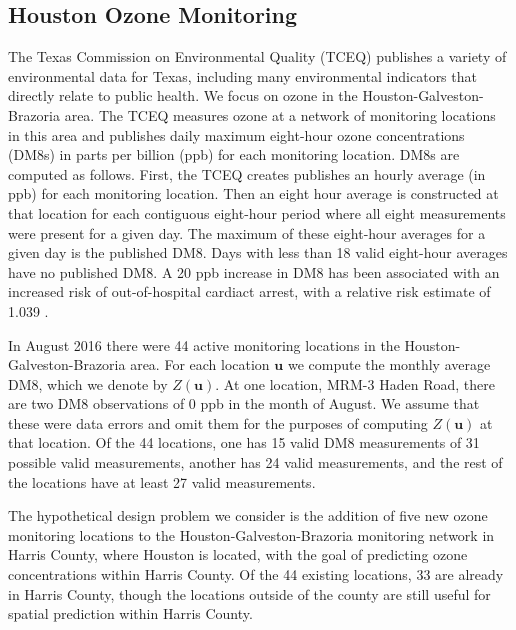 \documentclass[cmbright]{staauth}
\begin{document}
\subsection{Houston Ozone Monitoring}\label{sec:houston}
The Texas Commission on Environmental Quality (TCEQ) publishes a variety of environmental data for Texas, including many environmental indicators that directly relate to public health. We focus on ozone in the Houston-Galveston-Brazoria area. The TCEQ measures ozone at a network of monitoring locations in this area and publishes daily maximum eight-hour ozone concentrations (DM8s) in parts per billion (ppb) for each monitoring location. DM8s are computed as follows. First, the TCEQ creates publishes an hourly average (in ppb) for each monitoring location. Then an eight hour average is constructed at that location for each contiguous eight-hour period where all eight measurements were present for a given day. The maximum of these eight-hour averages for a given day is the published DM8. Days with less than 18 valid eight-hour averages have no published DM8. A 20 ppb increase in DM8 has been associated with an increased risk of out-of-hospital cardiact arrest, with a relative risk estimate of 1.039 \citep[95\% CI 1.005, 1.073]{ensor2013case}.

In August 2016 there were 44 active monitoring locations in the Houston-Galveston-Brazoria area. For each location $\bm{u}$ we compute the monthly average DM8, which we denote by $Z(\bm{u})$. At one location, MRM-3 Haden Road, there are two DM8 observations of 0 ppb in the month of August. We assume that these were data errors and omit them for the purposes of computing $Z(\bm{u})$ at that location. Of the 44 locations, one has 15 valid DM8 measurements of 31 possible valid measurements, another has 24 valid measurements, and the rest of the locations have at least 27 valid measurements.

The hypothetical design problem we consider is the addition of five new ozone monitoring locations to the Houston-Galveston-Brazoria monitoring network in Harris County, where Houston is located, with the goal of predicting ozone concentrations within Harris County. Of the 44 existing locations, 33 are already in Harris County, though the locations outside of the county are still useful for spatial prediction within Harris County.
\end{document}

